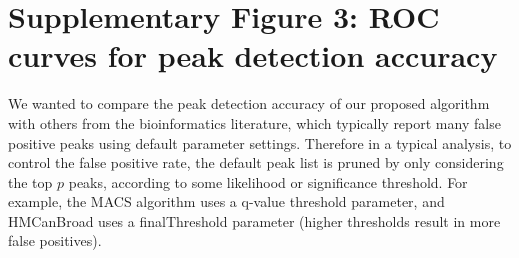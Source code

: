 \documentclass{article}
\begin{document}




\section*{Supplementary Figure 3: ROC curves for peak detection accuracy}
  
We wanted to compare the peak detection accuracy of our proposed
algorithm with others from the bioinformatics literature, which
typically report many false positive peaks using default parameter
settings. Therefore in a typical analysis, to control
the false positive rate, the default peak list is pruned by only
considering the top $p$ peaks, according to some likelihood or
significance threshold. For example, the MACS algorithm uses a q-value threshold parameter, and HMCanBroad uses a finalThreshold parameter (higher
thresholds result in more false positives). 
\end{document}
